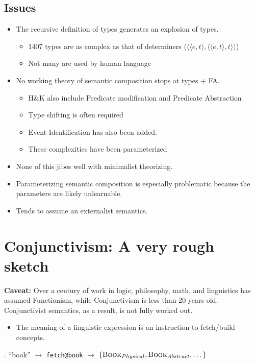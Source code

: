 \documentclass[letterpaper]{article}
\begin{document}
\subsection{Issues}
\begin{itemize}
  \item The recursive definition of types generates an explosion of types.\parencite{pietroski2015semantic}
    \begin{itemize}
      \item 1407 types are as complex as that of determiners ($\langle\langle e,t\rangle, \langle \langle e,t\rangle, t\rangle\rangle$)
      \item Not many are used by human language
    \end{itemize}
  \item No working theory of semantic composition stops at types + FA.
    \begin{itemize}
      \item H\&K also include Predicate modification and Predicate Abstraction
      \item Type shifting is often required \parencite{partee1987noun}
      \item Event Identification has also been added. \parencite{kratzer_severing_1996}
      \item These complexities have been parameterized \parencite[\textit{e.g.,}][]{compton2012diss}
    \end{itemize}
  \item None of this jibes well with minimalist theorizing.
  \item Parameterizing semantic composition is especially problematic because the parameters are likely unlearnable.
  \item Tends to assume an externalist semantics. 
\end{itemize}

\section{Conjunctivism: A very rough sketch}
\textbf{Caveat:} Over a century of work in logic, philosophy, math, and linguistics has assumed Functionism, while Conjunctivism is less than 20 years old.
Conjunctivist semantics, as a result, is not fully worked out. 
\begin{itemize}
  \item The meaning of a linguistic expression is an instruction to fetch/build concepts. \parencite{pietroski2015semantic}
\end{itemize}
\ex. ``book'' $\rightarrow$ \texttt{fetch@book} $\rightarrow$ $\left\{ \textsc{Book}_{Physical}, \textsc{Book}_{Abstract}, \dots \right\}$
\end{document}
